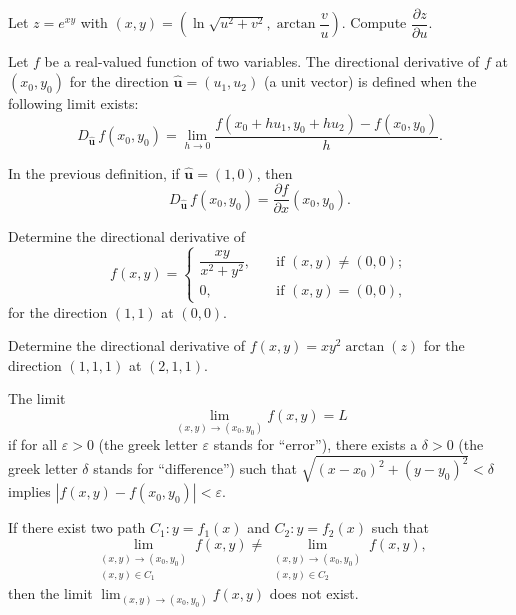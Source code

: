 \documentclass[11pt]{article}
\theoremstyle{break}
\newcommand{\dirderivative}[1]{D_{#1}\!\,}
\newcommand{\pderivative}[2]{\dfrac{\partial {#1}}{\partial {#2}}}
\newcommand{\bfu}{\textbf{u}}
\numberwithin{equation}{theorem}
\begin{document}
\begin{example}
    Let $z=e^{xy}$ with $(x, y)=\left(\ln\sqrt{u^2+v^2}, \arctan\dfrac{v}{u}\right)$. Compute $\pderivative{z}{u}$.
\end{example}
\newpage

\begin{definition}
    Let $f$ be a real-valued function of two variables. The directional derivative of $f$ at $(x_0, y_0)$ for the direction $\hat{\bfu}= (u_1, u_2)$ (a unit vector) is defined when the following limit exists:
    $$\dirderivative{\hat{\bfu}}f(x_0, y_0)=\lim_{h\to 0}\dfrac{f(x_0+hu_1, y_0+hu_2)-f(x_0, y_0)}{h}.$$
\end{definition}

\begin{remark}
    In the previous definition, if $\hat{\bfu}=(1, 0)$, then $$\dirderivative{\hat{\bfu}}f(x_0, y_0)=\pderivative{f}{x}(x_0, y_0).$$
\end{remark}

\begin{example}
    Determine the directional derivative of $$f(x, y)=\left\{\begin{array}{ll}
        \dfrac{xy}{x^2+y^2}, \quad&\text{if\ }(x, y)\ne(0, 0);\\
        0, &\text{if\ }(x, y)=(0, 0),
    \end{array}\right.$$
    for the direction $(1, 1)$ at $(0, 0)$.
\end{example}
\vspace{20em}

\begin{example}
    Determine the directional derivative of $f(x, y)=xy^2\arctan(z)$ for the direction $(1, 1, 1)$ at $(2, 1, 1)$.
\end{example}
\vspace{20em}

\begin{definition}[Limit]
    The limit $$\lim_{(x, y)\to(x_0, y_0)}f(x, y)=L$$ if for all $\varepsilon>0$ (the greek letter $\varepsilon$ stands for ``error''), there exists a $\delta>0$ (the greek letter $\delta$ stands for ``difference'') such that $\sqrt{(x-x_0)^2+(y-y_0)^2}<\delta$ implies $|f(x, y)-f(x_0, y_0)|<\varepsilon$.
\end{definition}

\begin{remark}
    If there exist two path $C_1: y=f_1(x)$ and $C_2: y=f_2(x)$ such that $$\lim_{\substack{(x, y)\to(x_0, y_0)\\(x, y)\in C_1}}f(x, y)\ne\lim_{\substack{(x, y)\to(x_0, y_0)\\(x, y)\in C_2}}f(x, y),$$ then the limit $\displaystyle\lim_{(x, y)\to(x_0, y_0)}f(x, y)$ does not exist.
\end{remark}
\end{document}
